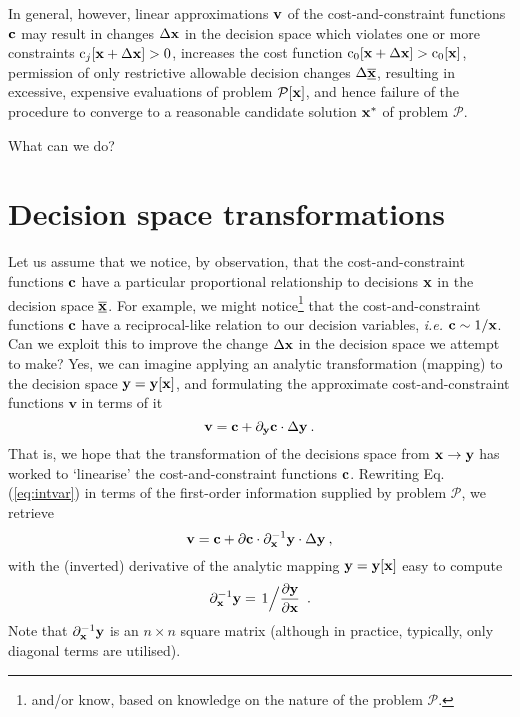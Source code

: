\documentclass[11pt]{article}
\begin{document}
In general, however, linear approximations $\mathbf{v}$ of the cost-and-constraint functions $\mathbf{c}$ may result in changes $\Delta \mathbf{x}$ in the decision space which violates one or more constraints $\textrm{c}_j[\mathbf{x} + \Delta \mathbf{x}] > 0$, increases the cost function $\textrm{c}_0[\mathbf{x} + \Delta \mathbf{x}] > \textrm{c}_0[\mathbf{x}]$, permission of only restrictive allowable decision changes $\Delta \underline{\overline{\mathbf{x}}}$, resulting in excessive, expensive evaluations of problem $\mathcal{P}[\mathbf{x}]$, and hence failure of the procedure to converge to a reasonable candidate solution $\mathbf{x}^\ast$ of problem $\mathcal{P}$.

What can we do?

\section{Decision space transformations}

Let us assume that we notice, by observation, that the cost-and-constraint functions $\mathbf{c}$ have a particular proportional relationship to decisions $\mathbf{x}$ in the decision space $\underline{\overline{\mathbf{x}}}$. For example, we might notice\footnote{and/or know, based on knowledge on the nature of the problem $\mathcal{P}$.} that the cost-and-constraint functions $\mathbf{c}$ have a reciprocal-like relation to our decision variables, \emph{i.e.} $\mathbf{c} \sim 1/\mathbf{x}$. Can we exploit this to improve the change $\Delta \mathbf{x}$ in the decision space we attempt to make? Yes, we can imagine applying an analytic transformation (mapping) to the decision space $\mathbf{y} = \mathbf{y}[\mathbf{x}]$, and formulating the approximate cost-and-constraint functions $\textbf{v}$ in terms of it
\begin{equation}
\label{eq:intvar}
    \textbf{v} = \mathbf{c} +   \partial_{\mathbf{y}} \mathbf{c} \cdot \Delta \mathbf{y} \:.
\end{equation}
That is, we hope that the transformation of the decisions space from $\mathbf{x} \to \mathbf{y}$ has worked to `linearise' the cost-and-constraint functions $\mathbf{c}$. Rewriting Eq. (\ref{eq:intvar}) in terms of the first-order information supplied by problem $\mathcal{P}$, we retrieve
\begin{equation}
    \textbf{v} = \mathbf{c} + \partial \mathbf{c} \cdot \partial_{\mathbf{x}}^{-1} \mathbf{y} \cdot  \Delta \mathbf{y}    \:,
\end{equation}
with the (inverted) derivative of the analytic mapping $\mathbf{y} = \mathbf{y}[\mathbf{x}]$ easy to compute
\begin{equation}
    \partial_{\mathbf{x}}^{-1} \mathbf{y} = \left. 1 \Big/ \frac{\partial \mathbf{y}}{\partial \mathbf{x}}\right. \: .
\end{equation}
Note that  $\partial_{\mathbf{x}}^{-1}\mathbf{y}$ is an $n \times n$ square matrix (although in practice, typically, only diagonal terms are utilised).
\end{document}
